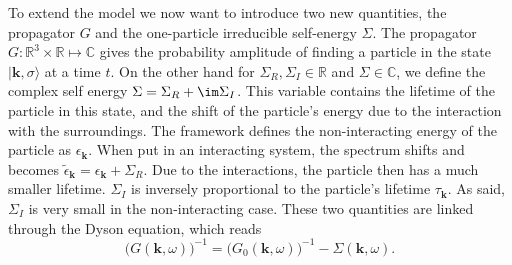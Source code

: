 \documentclass[../main.tex]{subfile}
\begin{document}
To extend the model we now want to introduce two new quantities,
the propagator $G$ and the one-particle irreducible self-energy $\Sigma$.
The propagator $G: \mathbb{R}^3\times\mathbb{R}\mapsto \mathbb{C}$ gives the probability amplitude of finding a particle in the state $|\bm{k},\sigma\rangle$ at a time $t$. On the other hand 
for $\Sigma_R, \Sigma_I \in \mathbb{R}$ and $\Sigma\in\mathbb{C}$, we define the complex self energy $\Sigma = \Sigma_R + \im \Sigma_I$. This variable contains 
the lifetime of the particle in this state, and the shift of the particle's energy due to the interaction with the surroundings. The framework defines the 
non-interacting energy of the particle as $\epsilon_{\bm{k}}$. When put in an interacting system, the spectrum shifts and becomes 
$\tilde{\epsilon}_{\bm{k}} =  \epsilon_{\bm{k}} + \Sigma_R$. Due to the interactions, the particle then has a much smaller lifetime. $\Sigma_I$ is inversely 
proportional to the particle's lifetime $\tau_{\bm{k}}$. As said, $\Sigma_I$ is very small in the non-interacting case. 
These two quantities are linked through the Dyson equation, which reads
\begin{equation} \label{eq:Dyson}
    \bigl(G(\bm{k}, \omega)\bigr)^{-1} =  \bigl(G_0(\bm{k}, \omega)\bigr)^{-1} - \Sigma(\bm{k},\omega).
\end{equation}
\end{document}
